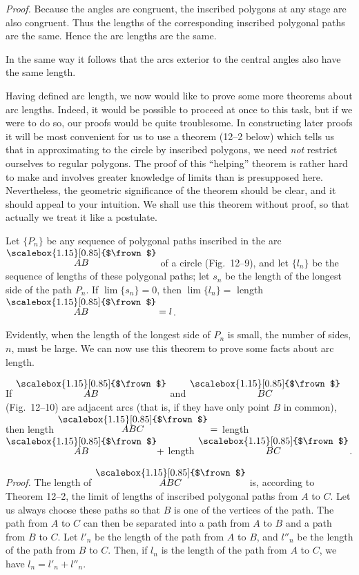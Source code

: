 \documentclass[11pt]{book}
\theoremstyle{bkplain}
\theoremstyle{XIplainnote}
\theoremstyle{bkplain}
\newcommand{\XIIarc}[1]{\overset{\raisebox{-0.25ex}{\scalebox{1.15}[0.85]{$\frown$}}}{#1}}
\theoremstyle{bkplain}
\begin{document}
\noindent\emph{Proof.} Because the angles are congruent, the inscribed polygons
at any stage are also congruent. Thus the lengths of the corresponding
inscribed polygonal paths are the same. Hence the arc lengths are the same.

\begin{remark}
In the same way it follows that the arcs exterior to the central angles also
have the same length.
\end{remark}

Having defined arc length, we now would like to prove some more theorems about
arc lengths. Indeed, it would be possible to proceed at once to this task, but
if we were to do so, our proofs would be quite troublesome. In constructing
later proofs it will be most convenient for us to use a theorem (12--2 below)
which tells us that in approximating to the circle by inscribed polygons, we
need \emph{not} restrict ourselves to regular polygons. The proof of this
``helping'' theorem is rather hard to make and involves greater knowledge of
limits than is presupposed here. Nevertheless, the geometric significance of the
theorem should be clear, and it should appeal to your intuition. We shall use
this theorem without proof, so that actually we treat it like a postulate.

\begin{theorem}
Let $\{P_n\}$ be any sequence of polygonal paths inscribed in the arc
$\XIIarc{AB}$ of a circle (Fig.~12--9), and let $\{l_n\}$ be the sequence of
lengths of these polygonal paths; let $s_n$ be the length of the longest side of
the path $P_n$. If $\lim \{s_n\} = 0$, then $\lim \{l_n\} = $ length
$\XIIarc{AB} = l$.
\end{theorem}

\begin{remark}
Evidently, when the length of the longest side of $P_n$ is small, the number of
sides, $n$, must be large. We can now use this theorem to prove some facts about
arc length.
\end{remark}

\begin{theorem}
If $\XIIarc{AB}$ and $\XIIarc{BC}$ (Fig.~12--10) are adjacent arcs (that is, if
they have only point $B$ in common), then length $\XIIarc{ABC} = $ length
$\XIIarc{AB} + $ length $\XIIarc{BC}$.
\end{theorem}

\FIGXIININETEN

\noindent\emph{Proof.} The length of $\XIIarc{ABC}$ is, according to
Theorem 12--2, the limit of lengths of inscribed polygonal paths from $A$ to
$C$. Let us always choose these paths so that $B$ is one of the vertices of the
path. The path from $A$ to $C$ can then be separated into a path from $A$ to $B$
and a path from $B$ to $C$. Let $l'_n$ be the length of the path from $A$ to
$B$, and $l''_n$ be the length of the path from $B$ to $C$. Then, if $l_n$ is
the length of the path from $A$ to $C$, we have $l_n = l'_n + l''_n$.
\end{document}
